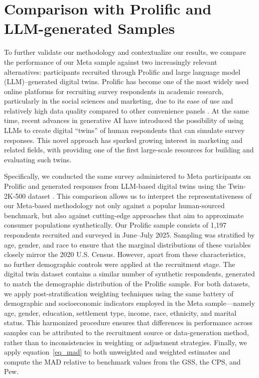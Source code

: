 \documentclass[letterpaper,12pt]{article}
\theoremstyle{proposition}
\begin{document}
\section*{Comparison with Prolific and LLM-generated Samples}

To further validate our methodology and contextualize our results, we compare the performance of our Meta sample against two increasingly relevant alternatives: participants recruited through Prolific and large language model (LLM)–generated digital twins. Prolific has become one of the most widely used online platforms for recruiting survey respondents in academic research, particularly in the social sciences and marketing, due to its ease of use and relatively high data quality compared to other convenience panels \citep{palan2018prolific}. At the same time, recent advances in generative AI have introduced the possibility of using LLMs to create digital ``twins'' of human respondents that can simulate survey responses. This novel approach has sparked growing interest in marketing and related fields, with \citet{toubia2025twin} providing one of the first large-scale resources for building and evaluating such twins. 

Specifically, we conducted the same survey administered to Meta participants on Prolific and generated responses from LLM-based digital twins using the Twin-2K-500 dataset \citep{toubia2025twin}. This comparison allows us to interpret the representativeness of our Meta-based methodology not only against a popular human-sourced benchmark, but also against cutting-edge approaches that aim to approximate consumer populations synthetically.
Our Prolific sample consists of 1,197 respondents recruited and surveyed in June–July 2025. Sampling was stratified by age, gender, and race to ensure that the marginal distributions of these variables closely mirror the 2020 U.S. Census. However, apart from these characteristics, no further demographic controls were applied at the recruitment stage. The digital twin dataset contains a similar number of synthetic respondents, generated to match the demographic distribution of the Prolific sample. For both datasets, we apply post-stratification weighting techniques using the same battery of demographic and socioeconomic indicators employed in the Meta sample—namely age, gender, education, settlement type, income, race, ethnicity, and marital status. This harmonized procedure ensures that differences in performance across samples can be attributed to the recruitment source or data-generation method, rather than to inconsistencies in weighting or adjustment strategies. Finally, we apply equation~\eqref{eq_mad} to both unweighted and weighted estimates and compute the MAD relative to benchmark values from the GSS, the CPS, and Pew.
\end{document}
